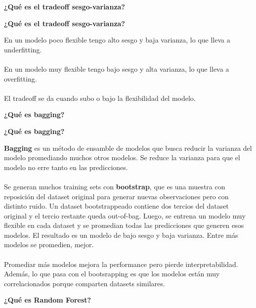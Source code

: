 \documentclass[10pt]{memoir}
\begin{document}
\clearpage
\begin{center}
	\textbf{\Large ¿Qué es el tradeoff sesgo-varianza?} \\
\end{center}

\clearpage
\begin{center}
	\textbf{\Large ¿Qué es el tradeoff sesgo-varianza?} \\
\end{center}
\noindent En un modelo poco flexible tengo alto sesgo y baja varianza, lo que lleva a underfitting. \\
\\
\noindent En un modelo muy flexible tengo bajo sesgo y alta varianza, lo que lleva a overfitting. \\
\\
\noindent El tradeoff se da cuando subo o bajo la flexibilidad del modelo.

\clearpage
\begin{center}
	\textbf{\Large ¿Qué es bagging?} \\
\end{center}

\clearpage
\begin{center}
	\textbf{\Large ¿Qué es bagging?} \\
\end{center}
\noindent \textbf{Bagging} es un método de ensamble de modelos que busca reducir la varianza del modelo promediando muchos otros modelos. Se reduce la varianza para que el modelo no erre tanto en las predicciones. \\
\\
Se generan muchos training sets con \textbf{bootstrap}, que es una muestra con reposición del dataset original para generar nuevas observaciones pero con distinto ruido. Un dataset bootstrappeado contiene dos tercios del dataset original y el tercio restante queda out-of-bag. Luego, se entrena un modelo muy flexible en cada dataset y se promedian todas las predicciones que generen esos modelos. El resultado es un modelo de bajo sesgo y baja varianza. Entre más modelos se promedien, mejor. \\
\\
Promediar más modelos mejora la performance pero pierde interpretabilidad. Además, lo que pasa con el bootsrapping es que los modelos están muy correlacionados porque comparten datasets similares.

\clearpage
\begin{center}
	\textbf{\Large ¿Qué es Random Forest?} \\
\end{center}
\end{document}

